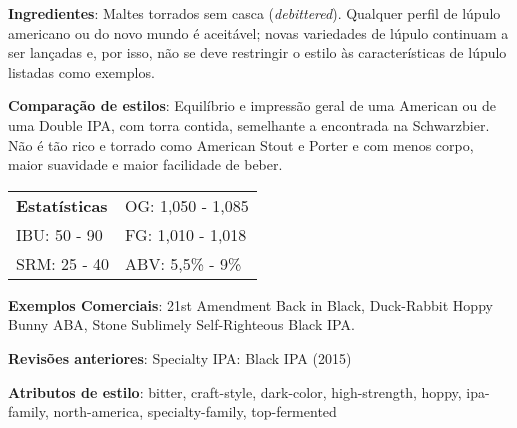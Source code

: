 \textbf{Ingredientes}: Maltes torrados sem casca (\textit{debittered}). Qualquer perfil de lúpulo americano ou do novo mundo é aceitável; novas variedades de lúpulo continuam a ser lançadas e, por isso, não se deve restringir o estilo às características de lúpulo listadas como exemplos.

\textbf{Comparação de estilos}: Equilíbrio e impressão geral de uma American ou de uma Double IPA, com torra contida, semelhante a encontrada na Schwarzbier. Não é tão rico e torrado como American Stout e Porter e com menos corpo, maior suavidade e maior facilidade de beber.

\begin{tabular}{@{}p{35mm}p{35mm}@{}}
  \textbf{Estatísticas} & OG: 1,050 - 1,085 \\
  IBU: 50 - 90  & FG: 1,010 - 1,018 \\
  SRM: 25 - 40  & ABV: 5,5\% - 9\%
\end{tabular}


\textbf{Exemplos Comerciais}: 21st Amendment Back in Black, Duck-Rabbit Hoppy Bunny ABA, Stone Sublimely Self-Righteous Black IPA.

\textbf{Revisões anteriores}: Specialty IPA: Black IPA (2015)

\textbf{Atributos de estilo}: bitter, craft-style, dark-color, high-strength, hoppy, ipa-family, north-america, specialty-family, top-fermented

